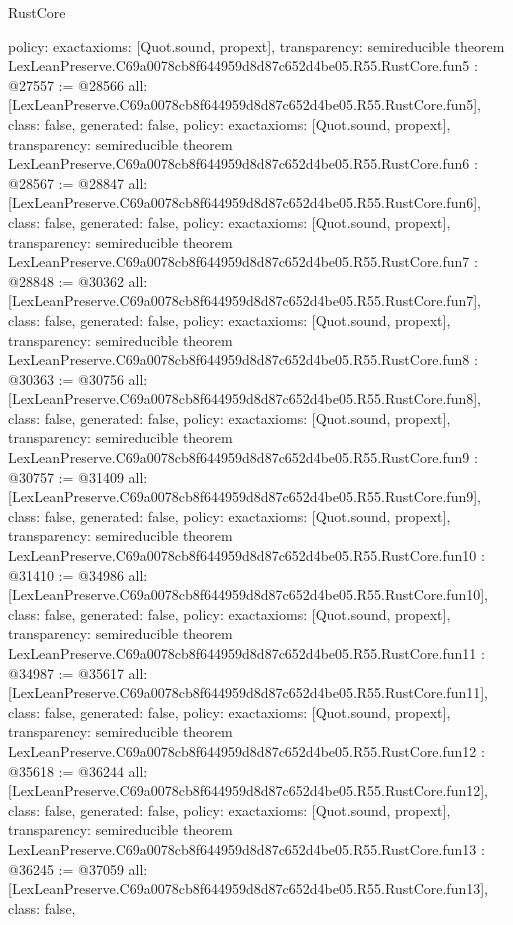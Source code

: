 \begin{lexlean}{RustCore}
\begin{coremodule}
{  policy: exact{axioms: [Quot.sound, propext]},
  transparency: semireducible
}
theorem LexLeanPreserve.C69a0078cb8f644959d8d87c652d4be05.R55.RustCore.fun5 : @27557 := @28566 {
  all: [LexLeanPreserve.C69a0078cb8f644959d8d87c652d4be05.R55.RustCore.fun5],
  class: false,
  generated: false,
  policy: exact{axioms: [Quot.sound, propext]},
  transparency: semireducible
}
theorem LexLeanPreserve.C69a0078cb8f644959d8d87c652d4be05.R55.RustCore.fun6 : @28567 := @28847 {
  all: [LexLeanPreserve.C69a0078cb8f644959d8d87c652d4be05.R55.RustCore.fun6],
  class: false,
  generated: false,
  policy: exact{axioms: [Quot.sound, propext]},
  transparency: semireducible
}
theorem LexLeanPreserve.C69a0078cb8f644959d8d87c652d4be05.R55.RustCore.fun7 : @28848 := @30362 {
  all: [LexLeanPreserve.C69a0078cb8f644959d8d87c652d4be05.R55.RustCore.fun7],
  class: false,
  generated: false,
  policy: exact{axioms: [Quot.sound, propext]},
  transparency: semireducible
}
theorem LexLeanPreserve.C69a0078cb8f644959d8d87c652d4be05.R55.RustCore.fun8 : @30363 := @30756 {
  all: [LexLeanPreserve.C69a0078cb8f644959d8d87c652d4be05.R55.RustCore.fun8],
  class: false,
  generated: false,
  policy: exact{axioms: [Quot.sound, propext]},
  transparency: semireducible
}
theorem LexLeanPreserve.C69a0078cb8f644959d8d87c652d4be05.R55.RustCore.fun9 : @30757 := @31409 {
  all: [LexLeanPreserve.C69a0078cb8f644959d8d87c652d4be05.R55.RustCore.fun9],
  class: false,
  generated: false,
  policy: exact{axioms: [Quot.sound, propext]},
  transparency: semireducible
}
theorem LexLeanPreserve.C69a0078cb8f644959d8d87c652d4be05.R55.RustCore.fun10 : @31410 := @34986 {
  all: [LexLeanPreserve.C69a0078cb8f644959d8d87c652d4be05.R55.RustCore.fun10],
  class: false,
  generated: false,
  policy: exact{axioms: [Quot.sound, propext]},
  transparency: semireducible
}
theorem LexLeanPreserve.C69a0078cb8f644959d8d87c652d4be05.R55.RustCore.fun11 : @34987 := @35617 {
  all: [LexLeanPreserve.C69a0078cb8f644959d8d87c652d4be05.R55.RustCore.fun11],
  class: false,
  generated: false,
  policy: exact{axioms: [Quot.sound, propext]},
  transparency: semireducible
}
theorem LexLeanPreserve.C69a0078cb8f644959d8d87c652d4be05.R55.RustCore.fun12 : @35618 := @36244 {
  all: [LexLeanPreserve.C69a0078cb8f644959d8d87c652d4be05.R55.RustCore.fun12],
  class: false,
  generated: false,
  policy: exact{axioms: [Quot.sound, propext]},
  transparency: semireducible
}
theorem LexLeanPreserve.C69a0078cb8f644959d8d87c652d4be05.R55.RustCore.fun13 : @36245 := @37059 {
  all: [LexLeanPreserve.C69a0078cb8f644959d8d87c652d4be05.R55.RustCore.fun13],
  class: false,
}
\end{coremodule}
\end{lexlean}
